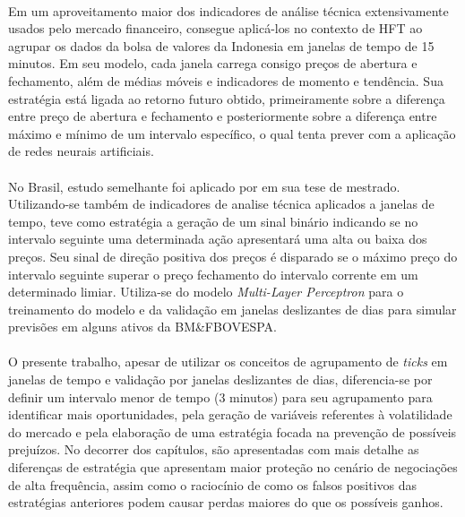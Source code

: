 \documentclass[grad,numbers]{coppe}
\begin{document}
        \paragraph{}Em um aproveitamento maior dos indicadores de análise técnica extensivamente usados pelo mercado financeiro, \citet{putra-hft} consegue aplicá-los no contexto de HFT ao agrupar os dados da bolsa de valores da Indonesia em janelas de tempo de 15 minutos. Em seu modelo, cada janela carrega consigo preços de abertura e fechamento, além de médias móveis e indicadores de momento e tendência. Sua estratégia está ligada ao retorno futuro obtido, primeiramente sobre a diferença entre preço de abertura e fechamento e posteriormente sobre a diferença entre máximo e mínimo de um intervalo específico, o qual tenta prever com a aplicação de redes neurais artificiais.
        
        \paragraph{}No Brasil, estudo semelhante foi aplicado por \citet{everton-silva-master} em sua tese de mestrado. Utilizando-se também de indicadores de analise técnica aplicados a janelas de tempo, teve como estratégia a geração de um sinal binário indicando se no intervalo seguinte uma determinada ação apresentará uma alta ou baixa dos preços. Seu sinal de direção positiva dos preços é disparado se o máximo preço do intervalo seguinte superar o preço fechamento do intervalo corrente em um determinado limiar. Utiliza-se do modelo \textit{Multi-Layer Perceptron} para o treinamento do modelo e da validação em janelas deslizantes de dias para simular previsões em alguns ativos da BM\&FBOVESPA.
        
        \paragraph{}O presente trabalho, apesar de utilizar os conceitos de agrupamento de \textit{ticks} em janelas de tempo e validação por janelas deslizantes de dias, diferencia-se por definir um intervalo menor de tempo (3 minutos) para seu agrupamento para identificar mais oportunidades, pela geração de variáveis referentes à volatilidade do mercado e pela elaboração de uma estratégia focada na prevenção de possíveis prejuízos. No decorrer dos capítulos, são apresentadas com mais detalhe as diferenças de estratégia que apresentam maior proteção no cenário de negociações de alta frequência, assim como o raciocínio de como os falsos positivos das estratégias anteriores podem causar perdas maiores do que os possíveis ganhos.
        
\end{document}
